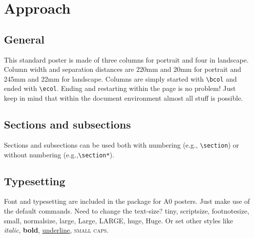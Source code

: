 \documentclass{article}
\begin{document}
\section*{Approach}
\subsection*{General}
This standard poster is made of three columns for portrait and four in landscape. Column width and separation distances are 220mm and 20mm for portrait and 245mm and 22mm for landscape. Columns are simply started with \verb|\bcol| and ended with \verb|\ecol|. Ending and restarting within the page is no problem!
Just keep in mind that within the document environment almost all \latex stuff is possible.

\subsection*{Sections and subsections}
Sections and subsections can be used both with numbering (e.g., \verb|\section|) or without numbering (e.g.,\verb|\section*|).

\subsection*{Typesetting}
Font and typesetting are included in the package for A0 posters. Just make use of the default \latex commands. Need to change the text-size?
{\tiny tiny}, 
{\scriptsize scriptsize}, 
{\footnotesize footnotesize}, 
{\small small}, 
{\normalsize normalsize}, 
{\large large}, 
{\Large Large}, 
{\LARGE LARGE},
{\huge huge}, 
{\Huge Huge}.
Or set other styles like \textit{italic}, \textbf{bold}, \underline{underline}, \textsc{small caps}.

\pushdown %

\end{document}
